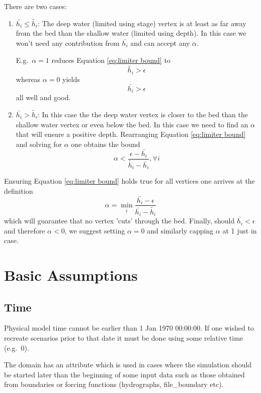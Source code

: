 \documentclass{manual}
\begin{document}
There are two cases:
\begin{enumerate}
  \item $\bar{h_i} \le \tilde{h_i}$: The deep water (limited using stage)
  vertex is at least as far away from the bed than the shallow water
  (limited using depth). In this case we won't need any contribution from
  $\bar{h_i}$ and can accept any $\alpha$.

  E.g.\ $\alpha=1$ reduces Equation \ref{eq:limiter bound} to
  \[
    \tilde{h_i} > \epsilon
  \]
  whereas $\alpha=0$ yields
  \[
    \bar{h_i} > \epsilon
  \]
  all well and good.
  \item $\bar{h_i} > \tilde{h_i}$: In this case the the deep water vertex is
  closer to the bed than the shallow water vertex or even below the bed.
  In this case we need to find an $\alpha$ that will ensure a positive depth.
  Rearranging Equation \ref{eq:limiter bound} and solving for $\alpha$ one
  obtains the bound
  \[
    \alpha < \frac{\epsilon - \bar{h_i}}{\tilde{h_i} - \bar{h_i}}, \forall i
  \]
\end{enumerate}

Ensuring Equation \ref{eq:limiter bound} holds true for all vertices one
arrives at the definition
\[
  \alpha = \min_{i} \frac{\bar{h_i} - \epsilon}{\bar{h_i} - \tilde{h_i}}
\]
which will guarantee that no vertex 'cuts' through the bed. Finally, should
$\bar{h_i} < \epsilon$ and therefore $\alpha < 0$, we suggest setting
$\alpha=0$ and similarly capping $\alpha$ at 1 just in case.



\chapter{Basic \anuga Assumptions}


\section{Time}

Physical model time cannot be earlier than 1 Jan 1970 00:00:00.
If one wished to recreate scenarios prior to that date it must be done
using some relative time (e.g.\ 0).

The \anuga domain has an attribute  which is used in cases where the
simulation should be started later than the beginning of some input data such as those
obtained from boundaries or forcing functions (hydrographs, file_boundary etc).
\end{document}
